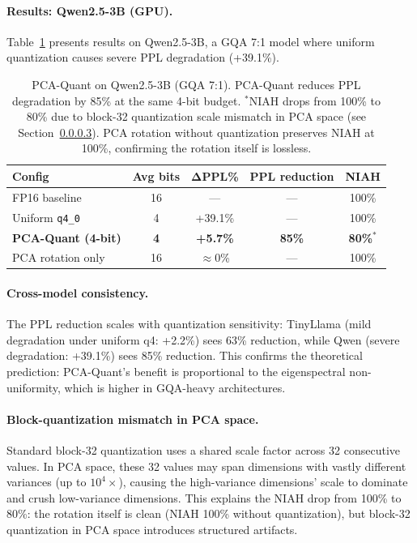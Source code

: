 \paragraph{Results: Qwen2.5-3B (GPU).}
Table~\ref{tab:pca-qwen} presents results on Qwen2.5-3B, a GQA 7:1 model where uniform quantization causes severe PPL degradation (+39.1\%).

\begin{table}[h]
\centering
\begin{tabular}{lcccc}
\toprule
\textbf{Config} & \textbf{Avg bits} & $\boldsymbol{\Delta}$\textbf{PPL\%} & \textbf{PPL reduction} & \textbf{NIAH} \\
\midrule
FP16 baseline & 16 & --- & --- & 100\% \\
Uniform \texttt{q4\_0} & 4 & +39.1\% & --- & 100\% \\
\textbf{PCA-Quant (4-bit)} & \textbf{4} & \textbf{+5.7\%} & \textbf{85\%} & \textbf{80\%}$^*$ \\
PCA rotation only & 16 & $\approx$0\% & --- & 100\% \\
\bottomrule
\end{tabular}
\caption{PCA-Quant on Qwen2.5-3B (GQA 7:1). PCA-Quant reduces PPL degradation by 85\% at the same 4-bit budget. $^*$NIAH drops from 100\% to 80\% due to block-32 quantization scale mismatch in PCA space (see Section~\ref{sec:block-mismatch}). PCA rotation without quantization preserves NIAH at 100\%, confirming the rotation itself is lossless.}
\label{tab:pca-qwen}
\end{table}

\paragraph{Cross-model consistency.}
The PPL reduction scales with quantization sensitivity: TinyLlama (mild degradation under uniform q4: +2.2\%) sees 63\% reduction, while Qwen (severe degradation: +39.1\%) sees 85\% reduction. This confirms the theoretical prediction: PCA-Quant's benefit is proportional to the eigenspectral non-uniformity, which is higher in GQA-heavy architectures.

\paragraph{Block-quantization mismatch in PCA space.}
\label{sec:block-mismatch}
Standard block-32 quantization uses a shared scale factor across 32 consecutive values. In PCA space, these 32 values may span dimensions with vastly different variances (up to $10^4\times$), causing the high-variance dimensions' scale to dominate and crush low-variance dimensions. This explains the NIAH drop from 100\% to 80\%: the rotation itself is clean (NIAH 100\% without quantization), but block-32 quantization in PCA space introduces structured artifacts.

